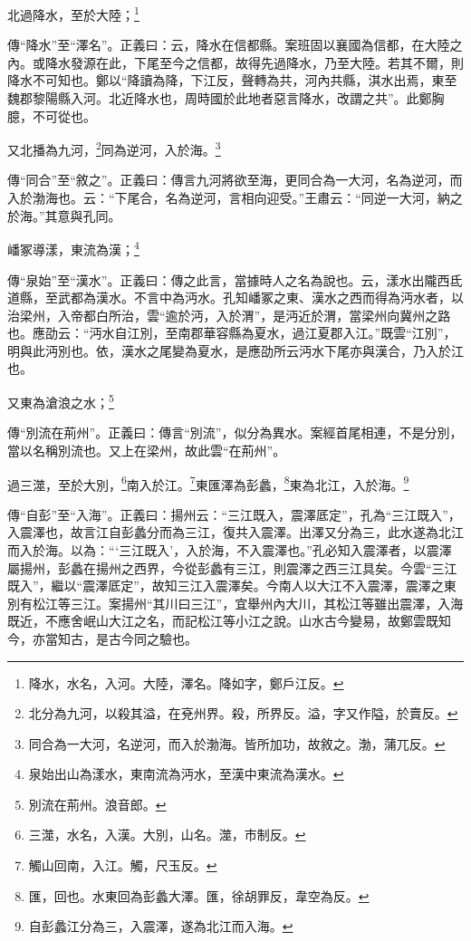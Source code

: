 北過降水，至於大陸；\footnote{降水，水名，入河。大陸，澤名。降如字，鄭戶江反。}

{\noindent\zhuan{}\fzbyks 傳“降水”至“澤名”。正義曰：云，降水在信都縣。案班固以襄國為信都，在大陸之內。或降水發源在此，下尾至今之信都，故得先過降水，乃至大陸。若其不爾，則降水不可知也。鄭以“降讀為降，下江反，聲轉為共，河內共縣，淇水出焉，東至魏郡黎陽縣入河。北近降水也，周時國於此地者惡言降水，改謂之共”。此鄭胸臆，不可從也。\par}

又北播為九河，\footnote{北分為九河，以殺其溢，在兗州界。殺，所界反。溢，字又作隘，於賣反。}同為逆河，入於海。\footnote{同合為一大河，名逆河，而入於渤海。皆所加功，故敘之。渤，蒲兀反。}

{\noindent\zhuan{}\fzbyks 傳“同合”至“敘之”。正義曰：傳言九河將欲至海，更同合為一大河，名為逆河，而入於渤海也。云：“下尾合，名為逆河，言相向迎受。”王肅云：“同逆一大河，納之於海。”其意與孔同。 \par}

嶓冢導漾，東流為漢；\footnote{泉始出山為漾水，東南流為沔水，至漢中東流為漢水。}

{\noindent\zhuan{}\fzbyks 傳“泉始”至“漢水”。正義曰：傳之此言，當據時人之名為說也。云，漾水出隴西氐道縣，至武都為漢水。不言中為沔水。孔知嶓冢之東、漢水之西而得為沔水者，以治梁州，入帝都白所治，雲“逾於沔，入於渭”，是沔近於渭，當梁州向冀州之路也。應劭云：“沔水自江別，至南郡華容縣為夏水，過江夏郡入江。”既雲“江別”，明與此沔別也。依，漢水之尾變為夏水，是應劭所云沔水下尾亦與漢合，乃入於江也。 \par}

又東為滄浪之水；\footnote{別流在荊州。浪音郎。}

{\noindent\zhuan{}\fzbyks 傳“別流在荊州”。正義曰：傳言“別流”，似分為異水。案經首尾相連，不是分別，當以名稱別流也。又上在梁州，故此雲“在荊州”。 \par}

過三澨，至於大別，\footnote{三澨，水名，入漢。大別，山名。澨，市制反。}南入於江。\footnote{觸山回南，入江。觸，尺玉反。}東匯澤為彭蠡，\footnote{匯，回也。水東回為彭蠡大澤。匯，徐胡罪反，韋空為反。}東為北江，入於海。\footnote{自彭蠡江分為三，入震澤，遂為北江而入海。}

{\noindent\zhuan{}\fzbyks 傳“自彭”至“入海”。正義曰：揚州云：“三江既入，震澤厎定”，孔為“三江既入”，入震澤也，故言江自彭蠡分而為三江，復共入震澤。出澤又分為三，此水遂為北江而入於海。以為：“‘三江既入’，入於海，不入震澤也。”孔必知入震澤者，以震澤屬揚州，彭蠡在揚州之西界，今從彭蠡有三江，則震澤之西三江具矣。今雲“三江既入”，繼以“震澤厎定”，故知三江入震澤矣。今南人以大江不入震澤，震澤之東別有松江等三江。案揚州“其川曰三江”，宜舉州內大川，其松江等雖出震澤，入海既近，不應舍岷山大江之名，而記松江等小江之說。山水古今變易，故鄭雲既知今，亦當知古，是古今同之驗也。 \par}


